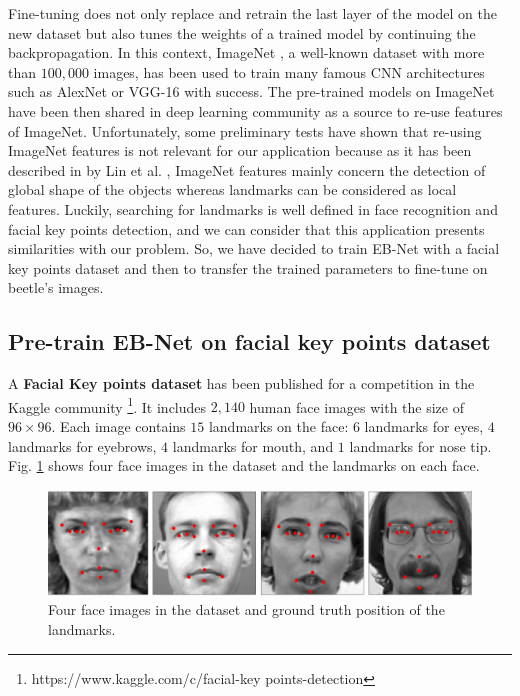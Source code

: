 \documentclass[review]{elsarticle}
\begin{document}
Fine-tuning does not only replace and retrain the last layer of the model on
the new dataset but also tunes the weights of a trained model by
continuing the backpropagation. In this context, ImageNet
\cite{imagenet_cvpr09}, a well-known dataset with more than $100,000 $
images, has been used to train many famous CNN architectures such as
AlexNet \cite{krizhevsky2012imagenet} or VGG-16
\cite{simonyan2014very} with success. The pre-trained models on
ImageNet have been then shared in deep learning community as a source
to re-use features of ImageNet. Unfortunately, some preliminary tests
have shown that re-using ImageNet features is not relevant for our
application because as it has been described in by Lin et
al. \cite{lin2016homemade}, ImageNet features mainly concern the
detection of global shape of the objects whereas landmarks can be
considered as local features. Luckily, searching for landmarks is
well defined in face recognition and facial key points detection, and 
we can consider that this application presents similarities with our problem. So,
we have decided to train EB-Net with a facial key points dataset and
then to transfer the trained parameters to fine-tune on beetle's
images.

\subsection{Pre-train EB-Net on facial key points dataset}
A \textbf{Facial Key points dataset} has been published for a
competition in the  Kaggle
community \footnote{https://www.kaggle.com/c/facial-key
  points-detection}. It includes $2,140$ human face images with the
size of $96 \times 96$. Each image contains $15$ landmarks on the
face: $6$ landmarks for eyes, $4$ landmarks for eyebrows, $4$
landmarks for mouth, and $1$ landmarks for nose
tip. Fig. \ref{figaface} shows four face images in the dataset and the
landmarks on each face.

\begin{figure}[htbp]
	\centerline{\includegraphics[scale=0.16]{images/face_dataset_2.png}}
	\caption{Four face images in the dataset and ground truth position of the landmarks.}
	\label{figaface}
\end{figure}
\end{document}
